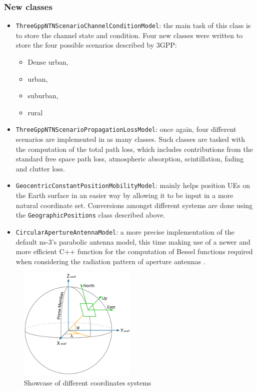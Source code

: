 \subsubsection{New classes}
\begin{itemize}
    \item \texttt{ThreeGppNTNScenarioChannelConditionModel}: the main task of this class is to store the channel state and condition. Four new classes were written to store the four possible scenarios described by \ac{3GPP}:
    \begin{itemize}
        \item Dense urban,
        \item urban,
        \item suburban,
        \item rural
    \end{itemize}
    \item \texttt{ThreeGppNTNScenarioPropagationLossModel}: once again, four different scenarios are implemented in as many classes. Such classes are tasked with the computation of the total path loss, which includes contributions from the standard free space path loss, atmospheric absorption, scintillation, fading and clutter loss.
    \item \texttt{GeocentricConstantPositionMobilityModel}: mainly helps position \ac{UE}s on the Earth surface in an easier way by allowing it to be input in a more natural coordinate set. Conversions amongst different systems are done using the \texttt{GeographicPositions} class described above.
    \item \texttt{CircularApertureAntennaModel}: a more precise implementation of the default ns-3's parabolic antenna model, this time making use of a newer and more efficient C++ function for the computation of Bessel functions required when considering the radiation pattern of aperture antennas \cite{rad-patterns}.
\end{itemize}




\begin{figure}[ht]
    \centering
    \includegraphics[width=0.5\textwidth]{res/coord_systems.png}
    \caption{Showcase of different coordinates systems \cite{wiki_coords}}
    \label{fig:coord-syst}
\end{figure}

